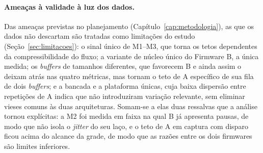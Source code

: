 \paragraph{Ameaças à validade à luz dos dados.} Das ameaças previstas no
planejamento (Capítulo~\ref{cap:metodologia}), as que os dados não
descartam são tratadas como limitações do estudo
(Seção~\ref{sec:limitacoes}): o sinal único de M1--M3, que torna os tetos
dependentes da compressibilidade do fluxo; a variante de núcleo único do
Firmware B, a única medida; os \emph{buffers} de tamanhos diferentes, que
favorecem B e ainda assim o deixam atrás nas quatro métricas, mas tornam
o teto de A específico de sua fila de dois \emph{buffers}; e a bancada e
a plataforma únicas, cuja baixa dispersão entre repetições de A indica
que não introduziram variação relevante, sem eliminar vieses comuns às
duas arquiteturas. Somam-se a elas duas ressalvas que a análise tornou
explícitas: a M2 foi medida em faixa na qual B já apresenta pausas, de modo
que não isola o \emph{jitter} do seu laço, e o teto de A em captura com
disparo ficou acima do alcance da grade, de modo que as razões entre os dois
firmwares são limites inferiores.
